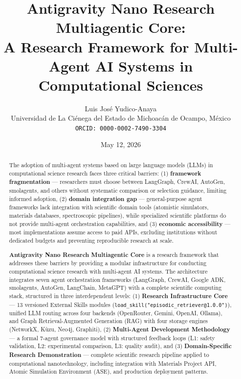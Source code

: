 \documentclass[11pt]{article}
\newcommand{\code}[1]{\texttt{#1}}
\begin{document}
\title{Antigravity Nano Research Multiagentic Core: \\
A Research Framework for Multi-Agent AI Systems in Computational Sciences}

\author{
    Luis José Yudico-Anaya \\
    \small Universidad de La Ciénega del Estado de Michoacán de Ocampo, México \\
    \small \texttt{ORCID: 0000-0002-7490-3304}
}

\date{May 12, 2026}

\maketitle

\begin{abstract}

The adoption of multi-agent systems based on large language models (LLMs) in computational science research faces three critical barriers: (1) \textbf{framework fragmentation} — researchers must choose between LangGraph, CrewAI, AutoGen, smolagents, and others without systematic comparison or selection guidance, limiting informed adoption, (2) \textbf{domain integration gap} — general-purpose agent frameworks lack integration with scientific domain tools (atomistic simulators, materials databases, spectroscopic pipelines), while specialized scientific platforms do not provide multi-agent orchestration capabilities, and (3) \textbf{economic accessibility} — most implementations assume access to paid APIs, excluding institutions without dedicated budgets and preventing reproducible research at scale.

\textbf{Antigravity Nano Research Multiagentic Core} is a research framework that addresses these barriers by providing a modular infrastructure for conducting computational science research with multi-agent AI systems. The architecture integrates seven agent orchestration frameworks (LangGraph, CrewAI, Google ADK, smolagents, AutoGen, LangChain, MetaGPT) with a complete scientific computing stack, structured in three interdependent levels: (1) \textbf{Research Infrastructure Core} — 13 versioned External Skills modules (\code{load\_skill("episodic\_retriever@1.0.0")}), unified LLM routing across four backends (OpenRouter, Gemini, OpenAI, Ollama), and Graph Retrieval-Augmented Generation (RAG) with four storage engines (NetworkX, Kùzu, Neo4j, Graphiti), (2) \textbf{Multi-Agent Development Methodology} — a formal 7-agent governance model with structured feedback loops (L1: safety validation, L2: experimental comparison, L3: quality audit), and (3) \textbf{Domain-Specific Research Demonstration} — complete scientific research pipeline applied to computational nanotechnology, including integration with Materials Project API, Atomic Simulation Environment (ASE), and production deployment patterns.


\end{abstract}
\end{document}
